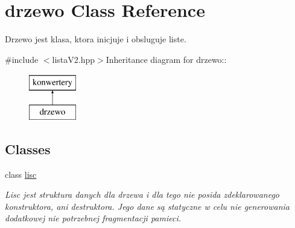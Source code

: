 \hypertarget{classdrzewo}{
\section{drzewo Class Reference}
\label{classdrzewo}
}


Drzewo jest klasa, ktora inicjuje i obsluguje liste.  


{\ttfamily \#include $<$listaV2.hpp$>$}Inheritance diagram for drzewo::\begin{figure}[H]
\begin{center}
\leavevmode
\includegraphics[height=2cm]{classdrzewo}
\end{center}
\end{figure}
\subsection*{Classes}
\begin{DoxyCompactItemize}
\item 
class \hyperlink{classdrzewo_1_1lisc}{lisc}
\begin{DoxyCompactList}\small\item\em Lisc jest struktura danych dla drzewa i dla tego nie posida zdeklarowanego konstruktora, ani destruktora. Jego dane są statyczne w celu nie generowania dodatkowej nie potrzebnej fragmentacji pamieci. \item\end{DoxyCompactList}\end{DoxyCompactItemize}
